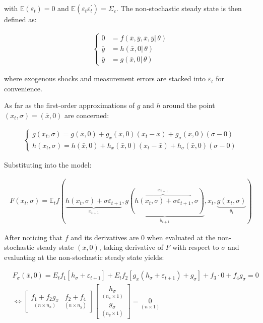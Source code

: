 \documentclass{pracamgr}
\numberwithin{equation}{section}
\begin{document}
with $\mathbb{E}(\varepsilon_{t}) = 0$ and $\mathbb{E}(\varepsilon_{t} \varepsilon_{t}^{'} ) = \Sigma_{\varepsilon}$. The non-stochastic steady state is then defined as:

\begin{align}
\left\{
\begin{array}{cl}
0 &= f \left(\bar{x}, \bar{y}, \bar{x}, \bar{y}| \, \theta \right) \\
\bar{y} &= h \left( \bar{x}, 0 | \, \theta \right) \\
\bar{y} &= g \left( \bar{x}, 0 | \, \theta \right)
\end{array}
\right.
\end{align}

where exogenous shocks and measurement errors are stacked into $\varepsilon_{t}$ for convenience.

As far as the first-order approximations of $g$ and $h$ around the point $(x_{t}, \sigma) = (\bar{x}, 0)$ are concerned:

\begin{align}
\left\{
\begin{array}{cl}
g(x_{t}, \sigma) = g(\bar{x}, 0) + g_{x}(\bar{x}, 0)(x_{t} - \bar{x}) + g_{\sigma}(\bar{x}, 0)(\sigma - 0) \\
h(x_{t}, \sigma) = h(\bar{x}, 0) + h_{x}(\bar{x}, 0)(x_{t} - \bar{x}) + h_{\sigma}(\bar{x}, 0)(\sigma - 0)
\end{array}
\right.
\end{align}

Substituting into the model:

\begin{align}
F(x_{t}, \sigma) = \mathbb{E}_{t} f \left( \underbrace{h(x_{t}, \sigma) + \sigma \varepsilon_{t+1}}_{x_{t+1}}, \underbrace{g \left( \overbrace{h\left(x_{t}, \sigma \right) + \sigma \varepsilon_{t+1}}^{x_{t+1}}, \sigma \right)}_{y_{t+1}}, x_{t}, \underbrace{g(x_{t}, \sigma)}_{y_{t}} \right)
\end{align}

After noticing that $f$ and its derivatives are 0 when evaluated at the non-stochastic steady state $\left(\bar{x}, 0\right)$, taking derivative of $F$ with respect to $\sigma$ and evaluating at the non-stochastic steady state yields:

\begin{eqnarray}
&F_\sigma(\overline{x},0) = E_t f_1[h_\sigma + \varepsilon_{t+1}] + E_t f_2 [g_x(h_\sigma+ \varepsilon_{t+1})+g_\sigma] + f_3\cdot 0 + f_4 g_\sigma = 0 \nonumber \\
 &  \iff \begin{bmatrix} \underset{(n \times n_x)}{f_1 + f_2 g_x} & \underset{(n\times n_y)}{f_2 +f_4}\end{bmatrix} \begin{bmatrix} \underset{(n_x \times 1)}{h_\sigma} \\ \underset{(n_y \times 1)}{g_\sigma} \end{bmatrix} = \underset{(n \times 1)}{0}
  \end{eqnarray}
\end{document}
